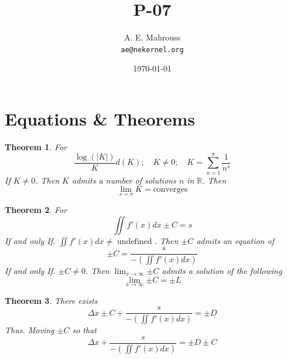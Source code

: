 \documentclass[11pt, a4paper]{article}
\title{P-07}
\author{A. E. Mahrouss\\\texttt{ae@nekernel.org}}
\date{\today}
\theoremstyle{plain}
\newtheorem{theorem}{Theorem}[section]
\theoremstyle{definition}
\theoremstyle{remark}
\begin{document}
\twocolumn[{%
  \maketitle
  \vspace{-0.5em}
  \vspace{0.8em}
  \rule{\linewidth}{0.4pt}
  \vspace{1em}
}]

\maketitle

\section{Equations \& Theorems}

\begin{theorem}
For
\begin{equation}
    \frac{\log(|K|)}{K} d(K); \quad K \neq 0; \quad K=\sum_{n=1}^{\pi} \frac{1}{n^s}
\end{equation}
If $K \neq 0$. Then $K$ admits a number of solutions $n$ in $\mathbb{R}$. Then
\begin{equation}
  \lim_{s=\pi} K = \text{converges}
\end{equation}
\end{theorem}

\begin{theorem}
For
\begin{equation}
  \iint f'(x) dx \pm C = s
\end{equation}
If and only If. $\iint f'(x) dx \neq \operatorname{undefined}$. Then $\pm C$ admits an equation of
\begin{equation}
  \pm C = \frac{s}{-(\iint f'(x) dx)}
\end{equation}
If and only If. $\pm C \neq 0$. Then $\lim_{x\to \infty}{\pm C}$ admits a solution of the following
\begin{equation}
  \lim_{x\to \infty}{\pm C} = \pm L
\end{equation}
\end{theorem}

\begin{theorem}
There exists
\begin{equation}
\Delta x \pm C + \frac{s}{-(\iint f'(x) dx)} = \pm D
\end{equation}
Thus. Moving $\pm C$ so that 
\begin{equation}
  \Delta x + \frac{s}{-(\iint f'(x) dx)} = \pm D \pm C 
\end{equation}
\end{theorem}
\end{document}
